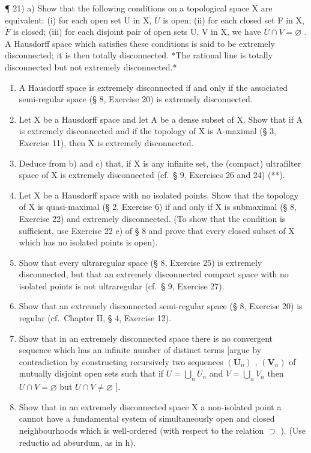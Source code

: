 ¶ 21) a) Show that the following conditions on a topological space X are equivalent: (i) for each open set U in X, \(\overline{U}\) is open; (ii) for each closed set F in X, \(\dot{F}\) is closed; (iii) for each disjoint pair of open sets U, V in X, we have \(\overline{U} \cap \overline{V} = \varnothing\) . A Hausdorff space which satisfies these conditions is said to be extremely disconnected; it is then totally disconnected. *The rational line is totally disconnected but not extremely disconnected.*

\begin{enumerate}
\def\labelenumi{\alph{enumi})}
\setcounter{enumi}{1}
\item
  A Hausdorff space is extremely disconnected if and only if the associated semi-regular space (§ 8, Exercise 20) is extremely disconnected.
\item
  Let X be a Hausdorff space and let A be a dense subset of X. Show that if A is extremely disconnected and if the topology of X is A-maximal (§ 3, Exercise 11), then X is extremely disconnected.
\item
  Deduce from b) and c) that, if X is any infinite set, the (compact) ultrafilter space of X is extremely disconnected (cf.~§ 9, Exercises 26 and 24) (**).
\item
  Let X be a Hausdorff space with no isolated points. Show that the topology of X is quasi-maximal (§ 2, Exercise 6) if and only if X is submaximal (§ 8, Exercise 22) and extremely disconnected. (To show that the condition is sufficient, use Exercise 22 e) of § 8 and prove that every closed subset of X which has no isolated points is open).
\item
  Show that every ultraregular space (§ 8, Exercise 25) is extremely disconnected, but that an extremely disconnected compact space with no isolated points is not ultraregular (cf.~§ 9, Exercise 27).
\item
  Show that an extremely disconnected semi-regular space (§ 8, Exercise 20) is regular (cf.~Chapter II, § 4, Exercise 12).
\item
  Show that in an extremely disconnected space there is no convergent sequence which has an infinite number of distinct terms {[}argue by contradiction by constructing recursively two sequences \((\mathbf{U}_{n})\) , \((\mathbf{V}_{n})\) of mutually disjoint open sets such that if \(U = \bigcup_{n} U_{n}\) and \(V = \bigcup_{n} V_{n}\) then \(U \cap V = \varnothing\) but \(\overline{U} \cap \overline{V} \neq \varnothing\) {]}.
\item
  Show that in an extremely disconnected space X a non-isolated point a cannot have a fundamental system of simultaneously open and closed neighbourhoods which is well-ordered (with respect to the relation \(\supset\) ). (Use reductio ad absurdum, as in h).
\end{enumerate}

